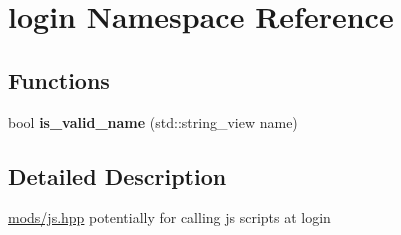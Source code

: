 \hypertarget{namespacelogin}{}\section{login Namespace Reference}
\label{namespacelogin}
\subsection*{Functions}
\begin{DoxyCompactItemize}
\item 
\mbox{\label{namespacelogin_a48d285275c05326d244cddcad82f55ea}} 
bool {\bfseries is\+\_\+valid\+\_\+name} (std\+::string\+\_\+view name)
\end{DoxyCompactItemize}


\subsection{Detailed Description}
\hyperlink{js_8hpp_source}{mods/js.\+hpp} potentially for calling js scripts at login 